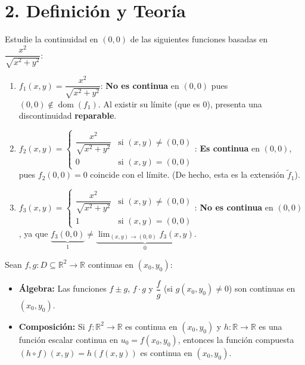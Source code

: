 \documentclass[11pt]{article}
\newenvironment{teoria}{%
  \section*{2. Definición y Teoría}%
}{}
\newenvironment{teorema}[1]{%
  \begin{tcolorbox}[colback=green!5,colframe=green!75!black,title=Teorema: #1]%
}{%
  \end{tcolorbox}%
}
\newenvironment{ejemplo}[1]{%
  \begin{tcolorbox}[colback=white,colframe=gray!40,title=Ejemplo: #1]%
}{%
  \end{tcolorbox}%
}
\begin{document}
\begin{teoria}
  \begin{ejemplo}{Análisis de Casos en el Origen}
    Estudie la continuidad en $(0,0)$ de las siguientes funciones basadas en $\dfrac{x^2}{\sqrt{x^2+y^2}}$:
    
    \begin{enumerate}
      \item $f_1(x,y) = \dfrac{x^2}{\sqrt{x^2+y^2}}$: \textbf{No es continua} en $(0,0)$ pues $(0,0) \notin \operatorname{dom}(f_1)$. Al existir su límite (que es $0$), presenta una discontinuidad \textbf{reparable}.
      \item $f_2(x,y) = \begin{cases} \dfrac{x^2}{\sqrt{x^2+y^2}} & \text{si } (x,y) \neq (0,0) \\ 0 & \text{si } (x,y) = (0,0) \end{cases}$: \textbf{Es continua} en $(0,0)$, pues $f_2(0,0) = 0$ coincide con el límite. (De hecho, esta es la extensión $\tilde{f}_1$).
      \item $f_3(x,y) = \begin{cases} \dfrac{x^2}{\sqrt{x^2+y^2}} & \text{si } (x,y) \neq (0,0) \\ 1 & \text{si } (x,y) = (0,0) \end{cases}$: \textbf{No es continua} en $(0,0)$, ya que $\underbrace{f_3(0,0)}_{1} \neq \underbrace{\displaystyle \lim_{(x,y)\to(0,0)} f_3(x,y)}_{0}$.
    \end{enumerate}
  \end{ejemplo}

  \begin{teorema}{Propiedades de las Funciones Continuas}
    Sean $f, g \colon D \subseteq \mathbb{R}^2 \to \mathbb{R}$ continuas en $(x_0, y_0)$:
    \begin{itemize}
      \item \textbf{Álgebra:} Las funciones $f \pm g$, $f \cdot g$ y $\dfrac{f}{g}$ (si $g(x_0, y_0) \neq 0$) son continuas en $(x_0, y_0)$.
      \item \textbf{Composición:} Si $f \colon \mathbb{R}^2 \to \mathbb{R}$ es continua en $(x_0, y_0)$ y $h \colon \mathbb{R} \to \mathbb{R}$ es una función escalar continua en $u_0 = f(x_0, y_0)$, entonces la función compuesta $(h \circ f)(x,y) = h(f(x,y))$ es continua en $(x_0, y_0)$.
    \end{itemize}
  \end{teorema}

\end{teoria}
\end{document}
